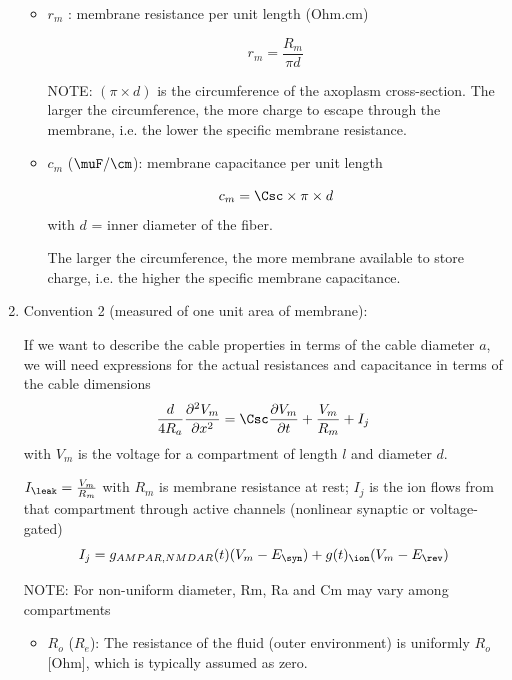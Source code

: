 \begin{enumerate}
\begin{itemize}
    \item $r_m$ : %
    membrane resistance per unit length (Ohm.cm)

\begin{equation}
r_m = \frac{R_m}{\pi d}
\end{equation}

NOTE: $(\pi \times d)$ is the circumference of the axoplasm cross-section. The
larger the circumference, the more charge to escape through the membrane, i.e.
the lower the specific membrane resistance.

   \item $c_m$ ($\muF/\cm$): %
   membrane capacitance per unit length
   
\begin{equation}
c_m = \Csc \times \pi \times d
\end{equation} 
with $d$ = inner diameter of the fiber.

The larger the circumference, the more membrane available to store charge, i.e.
the higher the specific membrane capacitance.
 
  \end{itemize}
  
  \item Convention 2 (measured of one unit area of membrane): 
  
  If we want to describe the cable properties in terms of the cable
diameter $a$, we will need expressions for the actual resistances and capacitance in
terms of the cable dimensions
\begin{equation}
\frac{d}{4R_a} \frac{\partial^2 V_m}{\partial x^2} = \Csc \frac{\partial
V_m}{\partial t} + \frac{V_m}{R_m} + I_j
\end{equation}
with $V_m$ is the voltage for a compartment of length $l$ and diameter $d$.

$I_\leak = \frac{V_m}{R_m}$ with $R_m$ is membrane resistance at rest;
$I_j$ is the ion flows from that compartment through active channels (nonlinear
synaptic or voltage-gated)
\begin{equation}
I_j = g_{AMPAR, NMDAR}(t) (V_m - E_\syn) + g(t)_\ion (V_m - E_\rev)
\end{equation}

NOTE: For non-uniform diameter, Rm, Ra and Cm may vary among compartments

  \begin{itemize}
    \item $R_o$ ($R_e$): The resistance of the fluid (outer
  environment) is uniformly $R_o$ [Ohm], which is typically assumed as zero.
  

\end{itemize}
\end{enumerate}
